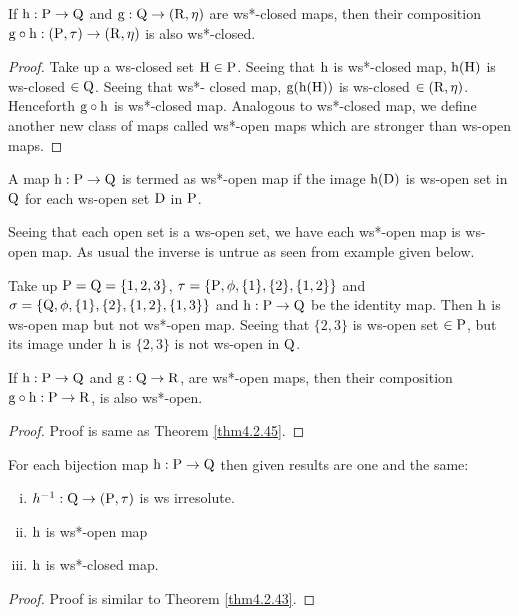 \begin{thm}\label{thm4.2.45}
If $\mathrm{h}: \mathrm{P} \to \mathrm{Q}$ and $\mathrm{g}: \mathrm{Q}\to (\mathrm{R}, \eta)$ are ws*-closed maps, then their composition $\mathrm{g} \circ \mathrm{h}: (\mathrm{P}, \tau) \to (\mathrm{R}, \eta)$ is also ws*-closed.
\end{thm}

\begin{proof}
Take up a ws-closed set $\mathrm{H} \in \mathrm{P}$. Seeing that $\mathrm{h}$ is ws*-closed map, $\mathrm{h} (\mathrm{H})$ is ws-closed $\in \mathrm{Q}$. Seeing that ws*- closed map, $\mathrm{g} (\mathrm{h} (\mathrm{H}))$ is ws-closed $\in (\mathrm{R},\eta)$. Henceforth $\mathrm{g} \circ \mathrm{h}$ is ws*-closed map. Analogous to ws*-closed map, we define another new class of maps called ws*-open maps which are stronger than ws-open maps.
\end{proof}

\begin{dfn}\label{defi4.2.46}
A map $\mathrm{h}: \mathrm{P} \to \mathrm{Q}$ is termed as ws*-open map if the image $\mathrm{h} (\mathrm{D})$ is ws-open set in $\mathrm{Q}$ for each ws-open set $\mathrm{D}$ in $\mathrm{P}$.
\end{dfn}

\begin{rem}\label{rem4.2.47}
Seeing that each open set is a ws-open set, we have each ws*-open map is ws-open map. As usual the inverse is untrue as seen from example given below.
\end{rem}

\begin{exm}\label{exam4.2.48}
Take up $\mathrm{P} = \mathrm{Q} = \{1, 2, 3\}$, $\tau = \{\mathrm{P}, \phi, \{1\}, \{2\}, \{1, 2\}\}$ and $\sigma =\{\mathrm{Q}, \phi, \{1\}, \{2\}, \{1, 2\},\{1,3\}\}$ and $\mathrm{h}: \mathrm{P} \to \mathrm{Q}$ be the identity map. Then $\mathrm{h}$ is ws-open map but not ws*-open map. Seeing that $\{2, 3\}$ is ws-open set $\in\mathrm{P}$, but its image under $\mathrm{h}$ is $\{2, 3\}$ is not ws-open in $\mathrm{Q}$.
\end{exm}

\begin{thm}\label{4.2.49}
If $\mathrm{h}: \mathrm{P} \to \mathrm{Q}$ and $\mathrm{g}: \mathrm{Q} \to \mathrm{R}$, are ws*-open maps, then their composition $\mathrm{g} \circ \mathrm{h}: \mathrm{P} \to \mathrm{R}$, is also ws*-open.
\end{thm}

\begin{proof}
Proof is same as Theorem \ref{thm4.2.45}.
\end{proof}

\newpage

\begin{thm}\label{thm4.2.50} 
For each bijection map $\mathrm{h}: \mathrm{P} \to \mathrm{Q}$ then given results are one and the same:
\begin{enumerate}[(i)]
\item $h^{-1}: \mathrm{Q}\to (\mathrm{P}, \tau)$ is ws irresolute.
\item $\mathrm{h}$ is ws*-open map
\item $\mathrm{h}$ is ws*-closed map.
\end{enumerate}
\end{thm}

\begin{proof}
Proof is similar to Theorem \ref{thm4.2.43}.
\end{proof}
